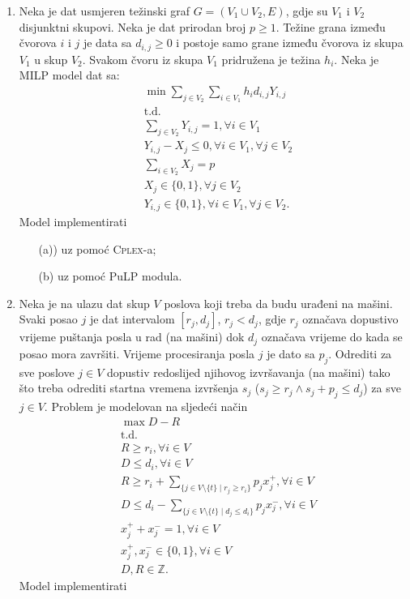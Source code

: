 \documentclass[b5paper, utf8, 11pt, colorlinks]{book}
\theoremstyle{definition}
\begin{document}
\begin{enumerate}
\item %
     Neka je dat usmjeren težinski graf $G= (V_1 \cup V_2, E)$, gdje su $V_1$ i $V_2$ disjunktni skupovi. Neka je dat prirodan broj $p\geq 1$. Težine grana između čvorova $i$ i $j$ je data sa $d_{i,j}\geq 0 $ i postoje samo grane između čvorova iz skupa $V_1$ u skup $V_2$. Svakom čvoru iz skupa $V_1$ pridružena je težina $h_{i}$. 
     Neka je MILP model dat  sa:
     \begin{align*}
     	 &\min \sum_{j \in V_2}\sum_{i \in V_1} h_i d_{i,j} Y_{i,j} \\
     	 &\mbox{t.d.} \\
     	 & \sum_{j \in V_2} Y_{i, j} = 1, \forall i \in V_1 \\
     	 & Y_{i,j} - X_j \leq 0, \forall i  \in V_1, \forall j \in V_2 \\     	 
     	 & \sum_{i \in V_2} X_j  = p \\
     	 & X_j \in \{0, 1\}, \forall j \in V_2 \\
     	 & Y_{i,j} \in \{0, 1\}, \forall i \in V_1, \forall j \in V_2.
     \end{align*}
      Model implementirati
      
      \begin{enumerate}
      	\item[(a))]  uz pomoć \textsc{Cplex}-a; 
      	\item[(b)] uz pomoć PuLP modula.
      \end{enumerate}
   \item   %
   Neka je na ulazu dat skup $V$ poslova koji treba da budu urađeni na mašini. Svaki posao $j$ je dat intervalom $[r_j, d_j]$, $r_j < d_j$, gdje $r_j$ označava dopustivo vrijeme puštanja posla u rad (na mašini) dok $d_j$ označava vrijeme do kada se posao mora završiti.  
   Vrijeme procesiranja posla $j$ je dato sa $p_j$. 
   Odrediti za sve poslove $j  \in V$ dopustiv redoslijed njihovog izvršavanja (na mašini) tako što treba odrediti startna vremena izvršenja $s_j$ ($s_j \geq r_j \wedge s_j + p_j \leq d_j$) za sve $j \in V$. Problem je modelovan na sljedeći način
   \begin{align*}
          &\max D - R \\
          & \mbox{t.d.} \\
          & R \geq r_i, \forall i \in V \\
          & D \leq d_i, \forall i \in V \\
          & R \geq r_i + \sum_{ \{ j \in V \setminus \{t\} \mid r_j \geq r_i \} } p_j x_j^+, \forall i \in V \\
          & D \leq d_i -  \sum_{ \{ j \in V \setminus \{t\} \mid d_j \leq d_i \}} p_j x_j^-, \forall i \in V \\
          & x_j^+ + x_j^-  = 1, \forall i \in V \\
          &   x_j^+, x_j^- \in \{0, 1\}, \forall i \in V \\
          & D, R \in \mathbb{Z}. 
   \end{align*} 
        Model implementirati
  

\end{enumerate}
\end{document}
